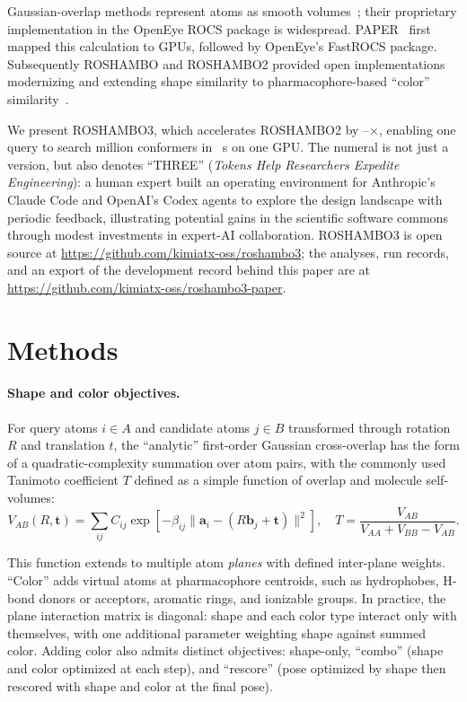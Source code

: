 \documentclass{article}
\newcommand{\vect}[1]{\bm{#1}}
\begin{document}
Gaussian-overlap methods represent atoms as smooth volumes~\citep{grant1995gaussian,grant1996fast}; their proprietary implementation in the OpenEye ROCS package is widespread.
PAPER~\citep{haque2010paper} first mapped this calculation to GPUs, followed by OpenEye's FastROCS package. Subsequently ROSHAMBO and ROSHAMBO2
provided open implementations modernizing and extending shape similarity to pharmacophore-based ``color'' similarity~\citep{atwi2024roshambo,atwi2025roshambo2}.

We present ROSHAMBO3, which accelerates ROSHAMBO2 by \VoltaShapeCorrectedSpeedupWhole--\VoltaComboStockSpeedupWhole$\times$,
enabling one query to search \ThreeCrMillionConformersWhole{} million conformers in \ThreeCrQOneWallSecondsWhole~s on one GPU.
The numeral is not just a version, but also denotes ``THREE'' (\emph{Tokens Help Researchers Expedite
Engineering}): a human expert built an operating environment for
Anthropic's Claude Code and OpenAI's Codex agents to explore the design landscape with periodic feedback, illustrating potential gains in the
scientific software commons through modest investments in expert-AI collaboration.
ROSHAMBO3 is open source at \url{https://github.com/kimiatx-oss/roshambo3}; the
analyses, run records, and an export of the development record behind this paper are at
\url{https://github.com/kimiatx-oss/roshambo3-paper}.




\section{Methods}
\label{sec:method}
\paragraph{Shape and color objectives.}
For query atoms $i\in A$ and candidate atoms $j\in B$ transformed through rotation $R$ and translation $t$, the
``analytic'' first-order Gaussian cross-overlap has the form of a quadratic-complexity summation over
atom pairs, with the commonly used Tanimoto coefficient $T$ defined as a simple function of 
overlap and molecule self-volumes:
\begin{equation}
 V_{AB}(R,\vect t)=\sum_{ij} C_{ij}
 \exp[-\beta_{ij}\|\vect a_i-(R\vect b_j+\vect t)\|^2],
 \quad T=\frac{V_{AB}}{V_{AA}+V_{BB}-V_{AB}} .
 \label{eq:overlap}
\end{equation}

This function extends to multiple atom \emph{planes} with defined inter-plane
weights. ``Color'' adds virtual atoms at pharmacophore centroids, such as hydrophobes,
H-bond donors or acceptors, aromatic rings, and ionizable groups. In practice,
the plane interaction matrix is diagonal: shape and each color type interact only
with themselves, with one additional parameter weighting shape against summed color. Adding
color also admits distinct objectives: shape-only, ``combo'' (shape and color
optimized at each step), and ``rescore'' (pose optimized by shape then rescored with shape and color
at the final pose).
\end{document}
